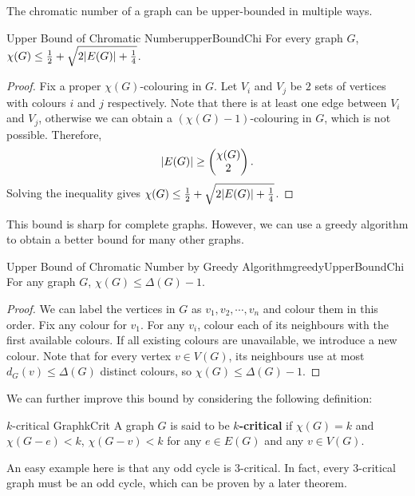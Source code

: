 \documentclass[math]{amznotes}
\theoremstyle{remark}
\newcommand{\0}{\mathbf{0}}
\newcommand{\1}{\mathbf{1}}
\begin{document}
The chromatic number of a graph can be upper-bounded in multiple ways.
\begin{probox}{Upper Bound of Chromatic Number}{upperBoundChi}
    For every graph $G$, $\chi(G) \leq \frac{1}{2} + \sqrt{2{\left\lvert {E(G)} \right\rvert} + \frac{1}{4}}$.
    \tcblower
    \begin{proof}
        Fix a proper $\chi(G)$-colouring in $G$. Let $V_i$ and $V_j$ be $2$ sets of vertices with colours $i$ and $j$ respectively. Note that there is at least one edge between $V_i$ and $V_j$, otherwise we can obtain a $(\chi(G) - 1)$-colouring in $G$, which is not possible. Therefore, 
        \begin{equation*}
            {\left\lvert {E(G)} \right\rvert} \geq \begin{pmatrix}
                \chi(G) \\
                2
            \end{pmatrix}.
        \end{equation*}
        Solving the inequality gives $\chi(G) \leq \frac{1}{2} + \sqrt{2{\left\lvert {E(G)} \right\rvert} + \frac{1}{4}}$.
    \end{proof}
\end{probox}
This bound is sharp for complete graphs. However, we can use a greedy algorithm to obtain a better bound for many other graphs.
\begin{probox}{Upper Bound of Chromatic Number by Greedy Algorithm}{greedyUpperBoundChi}
    For any graph $G$, $\chi(G) \leq \Delta(G) - 1$.
    \tcblower
    \begin{proof}
        We can label the vertices in $G$ as $v_1, v_2, \cdots, v_n$ and colour them in this order. Fix any colour for $v_1$. For any $v_i$, colour each of its neighbours with the first available colours. If all existing colours are unavailable, we introduce a new colour. Note that for every vertex $v \in V(G)$, its neighbours use at most $d_G(v) \leq \Delta(G)$ distinct colours, so $\chi(G) \leq \Delta(G) - 1$.
    \end{proof}
\end{probox}
We can further improve this bound by considering the following definition:
\begin{dfnbox}{$k$-critical Graph}{kCrit}
    A graph $G$ is said to be {\color{red} \textbf{$k$-critical}} if $\chi(G) = k$ and $\chi(G - e) < k$, $\chi(G - v) < k$ for any $e \in E(G)$ and any $v \in V(G)$.
\end{dfnbox}
An easy example here is that any odd cycle is $3$-critical. In fact, every $3$-critical graph must be an odd cycle, which can be proven by a later theorem.
\end{document}
